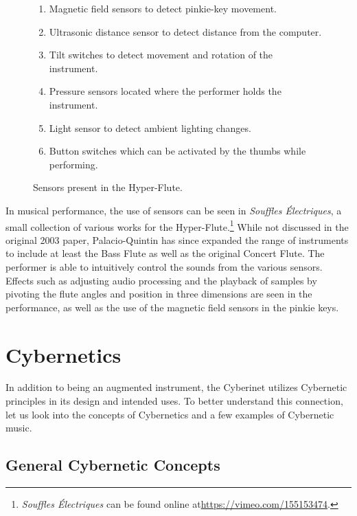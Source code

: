 \begin{figure}
    \centering
    \begin{enumerate}
        \item Magnetic field sensors to detect pinkie-key movement.
        \item Ultrasonic distance sensor to detect distance from the computer.
        \item Tilt switches to detect movement and rotation of the instrument.
        \item Pressure sensors located where the performer holds the instrument.
        \item Light sensor to detect ambient lighting changes.
        \item Button switches which can be activated by the thumbs while performing.
    \end{enumerate}
    \caption{Sensors present in the Hyper-Flute.}
    \label{fig:hyper-flute-sensors}
\end{figure}

In musical performance, the use of sensors can be seen in \textit{Souffles Électriques}, a small collection of various works for the Hyper-Flute.\footnote{\textit{Souffles Électriques} can be found online at\url{https://vimeo.com/155153474}.} While not discussed in the original 2003 paper, Palacio-Quintin has since expanded the range of instruments to include at least the Bass Flute as well as the original Concert Flute. The performer is able to intuitively control the sounds from the various sensors. Effects such as adjusting audio processing and the playback of samples by pivoting the flute angles and position in three dimensions are seen in the performance, as well as the use of the magnetic field sensors in the pinkie keys.


\section{Cybernetics}
In addition to being an augmented instrument, the Cyberinet utilizes Cybernetic principles in its design and intended uses. To better understand this connection, let us look into the concepts of Cybernetics and a few examples of Cybernetic music.

\subsection{General Cybernetic Concepts} %

